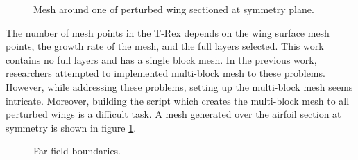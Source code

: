 \begin{figure}[!htbp]
    \centering
    \caption{Mesh around one of perturbed wing sectioned at symmetry plane.}
    \label{airfoil_mesh}
\end{figure}

The number of mesh points in the T-Rex depends on the wing surface mesh points, the growth rate of the mesh, and the full layers selected. This work contains no full layers and has a single block mesh. In the previous work, researchers attempted to implemented multi-block mesh to these problems. However, while addressing these problems, setting up the multi-block mesh seems intricate. Moreover, building the script which creates the multi-block mesh to all perturbed wings is a difficult task. A mesh generated over the airfoil section at symmetry is shown in figure \ref{airfoil_mesh}.

\begin{figure}[!htbp]
    \centering
    \caption{Far field boundaries.}
    \label{farfield}
\end{figure}

